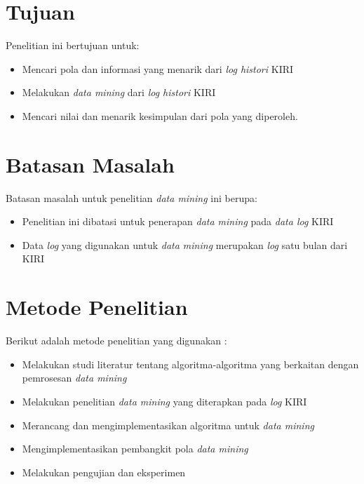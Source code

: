\section{Tujuan}
Penelitian ini bertujuan untuk:
\begin{itemize}
	\item Mencari pola dan informasi yang menarik dari \textsl{log histori} KIRI
	\item Melakukan \textsl{data mining} dari \textsl{log histori} KIRI
	\item Mencari nilai dan menarik kesimpulan dari pola yang diperoleh.
\end{itemize}

\section{Batasan Masalah}
Batasan masalah untuk penelitian \textsl{data mining} ini berupa: 
\begin{itemize}
	\item Penelitian ini dibatasi untuk penerapan \textsl{data mining} pada \textsl{data log} KIRI
	\item Data \textsl{log} yang digunakan untuk \textsl{data mining} merupakan \textsl{log} satu bulan dari KIRI
\end{itemize}

\section{Metode Penelitian}
Berikut adalah metode penelitian yang digunakan : 
	\begin{itemize}
		\item Melakukan studi literatur tentang algoritma-algoritma yang berkaitan dengan pemrosesan \textsl{data mining}
		\item Melakukan penelitian \textsl{data mining} yang diterapkan pada \textsl{log} KIRI
		\item Merancang dan mengimplementasikan algoritma untuk \textsl{data mining}
		\item Mengimplementasikan pembangkit pola \textsl{data mining}
		\item Melakukan pengujian dan eksperimen
	\end{itemize}

